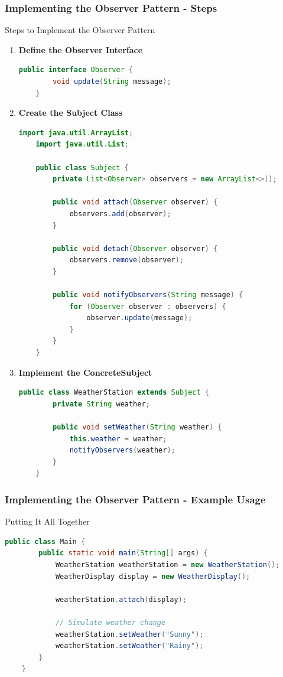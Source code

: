 \documentclass{beamer}
\begin{document}
\begin{frame}[fragile]
    \frametitle{Implementing the Observer Pattern - Steps}
    \begin{block}{Steps to Implement the Observer Pattern}
        \begin{enumerate}
            \item \textbf{Define the Observer Interface}
            \begin{lstlisting}[language=Java]
    public interface Observer {
        void update(String message);
    }
            \end{lstlisting}

            \item \textbf{Create the Subject Class}
            \begin{lstlisting}[language=Java]
    import java.util.ArrayList;
    import java.util.List;

    public class Subject {
        private List<Observer> observers = new ArrayList<>();
        
        public void attach(Observer observer) {
            observers.add(observer);
        }
        
        public void detach(Observer observer) {
            observers.remove(observer);
        }
        
        public void notifyObservers(String message) {
            for (Observer observer : observers) {
                observer.update(message);
            }
        }
    }
            \end{lstlisting}

            \item \textbf{Implement the ConcreteSubject}
            \begin{lstlisting}[language=Java]
    public class WeatherStation extends Subject {
        private String weather;

        public void setWeather(String weather) {
            this.weather = weather;
            notifyObservers(weather);
        }
    }
            \end{lstlisting}
        \end{enumerate}
    \end{block}
\end{frame}

\begin{frame}[fragile]
    \frametitle{Implementing the Observer Pattern - Example Usage}
    \begin{block}{Putting It All Together}
        \begin{lstlisting}[language=Java]
    public class Main {
        public static void main(String[] args) {
            WeatherStation weatherStation = new WeatherStation();
            WeatherDisplay display = new WeatherDisplay();
            
            weatherStation.attach(display);
            
            // Simulate weather change
            weatherStation.setWeather("Sunny");
            weatherStation.setWeather("Rainy");
        }
    }
        \end{lstlisting}
    \end{block}
\end{frame}
\end{document}
